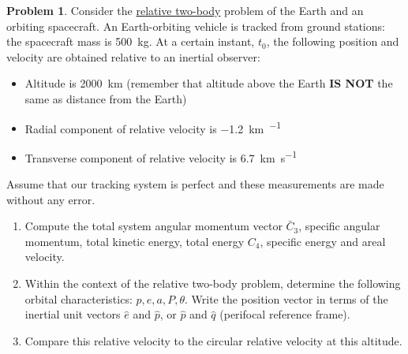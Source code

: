 \documentclass[10pt]{article}
\theoremstyle{definition}
\newtheorem{prob}{Problem}[section]
\newenvironment{subprob}%
{\renewcommand{\theenumi}{\alph{enumi}}\renewcommand{\labelenumi}{(\theenumi)}\begin{enumerate}}%
{\end{enumerate}}%
\begin{document}
\begin{prob}
    Consider the \underline{relative two-body} problem of the Earth and an orbiting spacecraft.
    An Earth-orbiting vehicle is tracked from ground stations: the spacecraft mass is \SI{500}{\kilo\gram}.
    At a certain instant, \( t_0 \), the following position and velocity are obtained relative to an inertial observer:
    \begin{itemize}
        \item Altitude is \SI{2000}{\kilo\meter} (remember that altitude above the Earth  \textbf{IS NOT} the same as distance from the Earth)
        \item Radial component of relative velocity is \SI{-1.2}{\kilo\meter\per\sec}
        \item Transverse component of relative velocity is \SI{6.7}{\kilo\meter\per\second}
    \end{itemize}

    Assume that our tracking system is perfect and these measurements are made without any error.
    \begin{subprob}
        \item Compute the total system angular momentum vector \( \bar C_3 \), specific angular momentum, total kinetic energy, total energy \( C_4 \), specific energy and areal velocity.
        \item Within the context of the relative two-body problem, determine the following orbital characteristics: \( p, e, a, P, \theta \).
            Write the position vector in terms of the inertial unit vectors \( \hat e\) and \( \hat p \), or \( \hat p \) and \( \hat q \) (perifocal reference frame).
        \item Compare this relative velocity to the circular relative velocity at this altitude.
    \end{subprob}
\end{prob}
\end{document}
